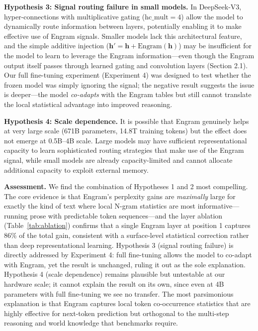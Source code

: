 \documentclass{article}
\begin{document}
\textbf{Hypothesis 3: Signal routing failure in small models.}
In DeepSeek-V3, hyper-connections with multiplicative gating ($\text{hc\_mult}=4$) allow the model to dynamically route information between layers, potentially enabling it to make effective use of Engram signals. Smaller models lack this architectural feature, and the simple additive injection ($\mathbf{h}' = \mathbf{h} + \text{Engram}(\mathbf{h})$) may be insufficient for the model to learn to leverage the Engram information---even though the Engram output itself passes through learned gating and convolution layers (Section 2.1). Our full fine-tuning experiment (Experiment 4) was designed to test whether the frozen model was simply ignoring the signal; the negative result suggests the issue is deeper---the model \emph{co-adapts} with the Engram tables but still cannot translate the local statistical advantage into improved reasoning.

\textbf{Hypothesis 4: Scale dependence.}
It is possible that Engram genuinely helps at very large scale (671B parameters, 14.8T training tokens) but the effect does not emerge at 0.5B--4B scale. Large models may have sufficient representational capacity to learn sophisticated routing strategies that make use of the Engram signal, while small models are already capacity-limited and cannot allocate additional capacity to exploit external memory.

\textbf{Assessment.}
We find the combination of Hypotheses 1 and 2 most compelling. The core evidence is that Engram's perplexity gains are \emph{maximally} large for exactly the kind of text where local N-gram statistics are most informative---running prose with predictable token sequences---and the layer ablation (Table~\ref{tab:ablation}) confirms that a single Engram layer at position 1 captures 86\% of the total gain, consistent with a surface-level statistical correction rather than deep representational learning. Hypothesis 3 (signal routing failure) is directly addressed by Experiment 4: full fine-tuning allows the model to co-adapt with Engram, yet the result is unchanged, ruling it out as the sole explanation. Hypothesis 4 (scale dependence) remains plausible but untestable at our hardware scale; it cannot explain the result on its own, since even at 4B parameters with full fine-tuning we see no transfer. The most parsimonious explanation is that Engram captures local token co-occurrence statistics that are highly effective for next-token prediction but orthogonal to the multi-step reasoning and world knowledge that benchmarks require.
\end{document}
